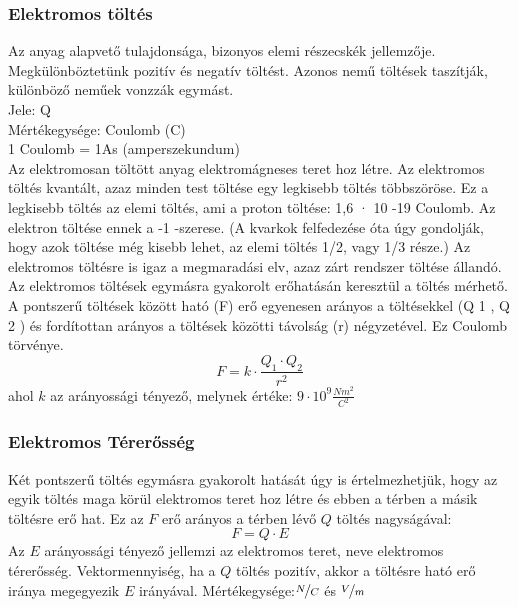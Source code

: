 \subsubsection{Elektromos töltés}
Az anyag alapvető tulajdonsága, bizonyos elemi részecskék jellemzője. Megkülönböztetünk pozitív és negatív töltést. Azonos nemű töltések taszítják, különböző neműek vonzzák egymást.\\
Jele: Q\\
Mértékegysége: Coulomb (C)\\
1 Coulomb = 1As (amperszekundum)\\
Az elektromosan töltött anyag elektromágneses teret hoz létre. Az elektromos töltés kvantált, azaz minden test töltése egy legkisebb töltés többszöröse. Ez a legkisebb töltés az elemi töltés, ami a proton töltése: 1,6 · 10 -19 Coulomb. Az elektron töltése ennek a -1 -szerese. (A kvarkok felfedezése óta úgy gondolják, hogy azok töltése még kisebb lehet, az elemi töltés 1/2, vagy 1/3 része.) Az elektromos töltésre is igaz a megmaradási elv, azaz zárt rendszer töltése állandó. Az elektromos töltések egymásra gyakorolt erőhatásán keresztül a töltés mérhető. A pontszerű töltések között ható (F) erő egyenesen arányos a töltésekkel (Q 1 , Q 2 ) és fordítottan arányos a töltések közötti
távolság (r) négyzetével. Ez Coulomb törvénye.
$$F=k\cdot\frac{Q_1 \cdot Q_2}{r^2}$$
ahol $k$ az arányossági tényező, melynek értéke: $9\cdot10^9 \frac{Nm^2}{C^2}$

\subsubsection{Elektromos Térerősség}
Két pontszerű töltés egymásra gyakorolt hatását úgy is értelmezhetjük, hogy az egyik töltés maga körül elektromos teret hoz létre és ebben a térben a másik töltésre erő hat. Ez az $F$ erő arányos a térben lévő $Q$ töltés nagyságával:
$$F=Q\cdot E$$
Az $E$ arányossági tényező jellemzi az elektromos teret, neve elektromos térerősség. Vektormennyiség, ha a $Q$ töltés pozitív, akkor a töltésre ható erő iránya megegyezik $E$ irányával.
Mértékegysége:$\nicefrac{N}{C}$ és $\nicefrac{V}{m}$

